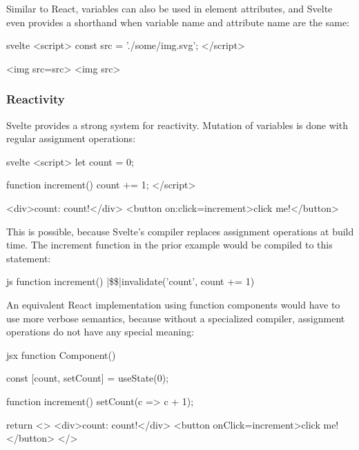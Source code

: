 Similar to React, variables can also be used in element attributes, and Svelte even provides a shorthand when variable name and attribute name are the same:
\begin{myminted}{svelte}{}
<script>
    const src = './some/img.svg';
</script>

<img src={src}>
<img {src}> 
\end{myminted}

\subsubsection{Reactivity}

Svelte provides a strong system for reactivity. Mutation of variables is done with regular assignment operations:

\begin{myminted}{svelte}{}
<script>
    let count = 0;

    function increment() {
        count += 1;
    }
</script>

<div>count: {count}!</div>
<button on:click={increment}>click me!</button>
\end{myminted}

This is possible, because Svelte's compiler replaces assignment operations at build time. The increment function in the prior example would be compiled to this statement:

\begin{myminted}[escapeinside=||]{js}{}
function increment() {
    |\$\$|invalidate('count', count += 1)
}
\end{myminted}

An equivalent React implementation using function components would have to use more verbose semantics, because without a specialized compiler, assignment operations do not have any special meaning:

\begin{myminted}{jsx}{}
function Component() {
    const [count, setCount] = useState(0);

    function increment() {
        setCount(c => c + 1);
    }

    return <>
        <div>count: {count}!</div>
        <button onClick={increment}>click me!</button>
    </>
}
\end{myminted}

